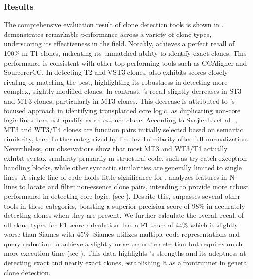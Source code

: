 \subsubsection{Results}
The comprehensive evaluation result of clone detection tools is shown in . 
\toolname demonstrates remarkable performance across a variety of clone types, underscoring its effectiveness in the field. 
Notably, \toolname achieves a perfect recall of 100\% in T1 clones, indicating its unmatched ability to identify exact clones. 
This performance is consistent with other top-performing tools such as CCAligner and SourcererCC. 
In detecting T2 and VST3 clones, \toolname also exhibits scores closely rivaling or matching the best, highlighting its robustness in detecting more complex, slightly modified clones. 
In contrast, \toolname's recall slightly decreases in ST3 and MT3 clones, particularly in MT3 clones. 
This decrease is attributed to \toolname's focused approach in identifying transplanted core logic, as duplicating non-core logic lines does not qualify as an essence clone. According to Svajlenko et al.~\cite{svajlenko2014big}, MT3 and WT3/T4 clones are function pairs initially selected based on semantic similarity, then further categorized by line-level similarity after full normalization. Nevertheless, our observations show that most MT3 and WT3/T4 actually exhibit syntax similarity primarily in structural code, such as try-catch exception handling blocks, while other syntactic similarities are generally limited to single lines. A single line of code holds little significance for \toolname. \toolname analyzes features in N-lines to locate and filter non-essence clone pairs, intending to provide more robust performance in detecting core logic.  (see ).
Despite this, \toolname surpasses several other tools in these categories, boasting a superior precision score of 98\% in accurately detecting clones when they are present.
We further calculate the overall recall of all clone types for F1-score calculation. \toolname has a F1-score of 44\% which is slightly worse than Siames with 45\%. Siames utilizes multiple code representations and query reduction to achieve a slightly more accurate detection but requires much more execution time (see ).
This data highlights \toolname's strengths and its adeptness at detecting exact and nearly exact clones, establishing it as a frontrunner in general clone detection.


